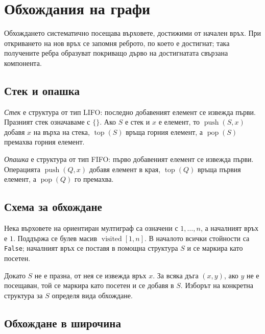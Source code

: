 \section{Обхождания на графи}\label{s:3.5}

Обхождането систематично посещава върховете, достижими от начален връх. При откриването на нов връх се запомня реброто, по което е достигнат; така получените ребра образуват покриващо дърво на достигнатата свързана компонента.

\subsection{Стек и опашка}\label{s:3.5.1}

\begin{defn}
\emph{Стек} е структура от тип LIFO: последно добавеният елемент се извежда първи. Празният стек означаваме с $\{\}$. Ако $S$ е стек и $x$ е елемент, то $\operatorname{push}(S,x)$ добавя $x$ на върха на стека, $\operatorname{top}(S)$ връща горния елемент, а $\operatorname{pop}(S)$ премахва горния елемент.
\end{defn}

\begin{defn}
\emph{Опашка} е структура от тип FIFO: първо добавеният елемент се извежда първи. Операцията $\operatorname{push}(Q,x)$ добавя елемент в края, $\operatorname{top}(Q)$ връща първия елемент, а $\operatorname{pop}(Q)$ го премахва.
\end{defn}

\subsection{Схема за обхождане}\label{s:3.5.2}

Нека върховете на ориентиран мултиграф са означени с $1,\ldots,n$, а началният връх е $1$. Поддържа се булев масив $\operatorname{visited}[1,n]$. В началото всички стойности са \texttt{False}; началният връх се поставя в помощна структура $S$ и се маркира като посетен.

Докато $S$ не е празна, от нея се извежда връх $x$. За всяка дъга $(x,y)$, ако $y$ не е посещаван, той се маркира като посетен и се добавя в $S$. Изборът на конкретна структура за $S$ определя вида обхождане.

\subsection{Обхождане в широчина}\label{s:3.5.3}

